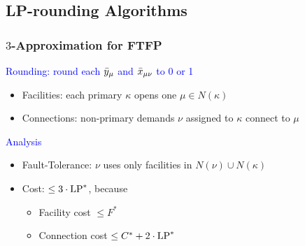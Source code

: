 \documentclass[hyperref,dvipsnames,svgnames,compress]{beamer}
\begin{document}
\subsection[Rounding]{LP-rounding Algorithms}

\begin{frame}
  \frametitle{$3$-Approximation for FTFP}

{\large
\textcolor{blue}{Rounding: round each ${\bar y}_{\mu}$ and ${\bar x}_{\mu\nu}$ to 0 or 1}

  	\begin{itemize}
  	\item \textcolor{Sepia}{Facilities:}
 					each primary $\kappa$ opens one $\mu\in N(\kappa)$
  	\item \textcolor{Sepia}{Connections:}
 					non-primary demands $\nu$ assigned to $\kappa$ connect to $\mu$
  	\end{itemize}

\textcolor{blue}{Analysis}

  \begin{itemize}
  	\item \textcolor{Sepia}{Fault-Tolerance:}
 			$\nu$ uses only facilities in $N(\nu) \cup N(\kappa)$
  	\item \textcolor{Sepia}{Cost:} $\le 3\cdot\mbox{\rm LP}^\ast$, because
    	\begin{itemize}
    		\item Facility cost $\le F^\ast$
    		\item Connection cost $\le C^\ast + 2\cdot\mbox{\rm LP}^\ast$
    	\end{itemize}
 	\end{itemize}
}
\end{frame}

\end{document}
